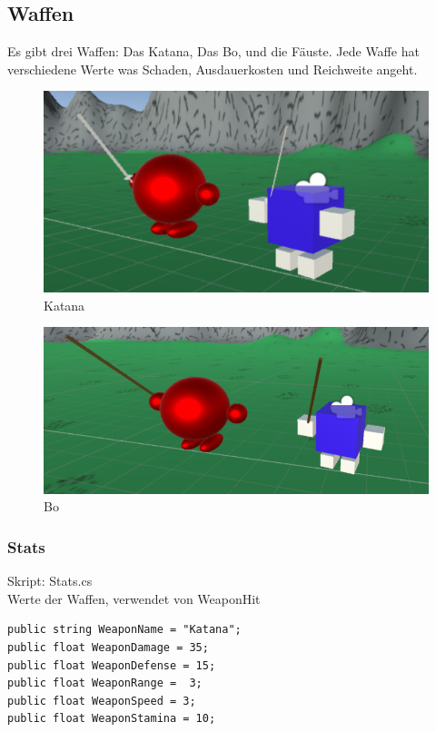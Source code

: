 
\subsection{Waffen}

Es gibt drei  Waffen: Das Katana, Das Bo, und die Fäuste.
Jede Waffe hat verschiedene Werte was Schaden, Ausdauerkosten und Reichweite angeht.
\begin{figure}[H]
\includegraphics[scale=1]{screenshots/katana.png}
\caption{Katana}
\end{figure}

\begin{figure}[H]
\includegraphics[scale=1]{screenshots/bo.png}
\caption{Bo}
\end{figure}



\subsubsection{Stats}
Skript: Stats.cs\\
Werte der Waffen, verwendet von WeaponHit

\begin{lstlisting}
public string WeaponName = "Katana";
public float WeaponDamage = 35;
public float WeaponDefense = 15;
public float WeaponRange =	3;
public float WeaponSpeed = 3;
public float WeaponStamina = 10;
\end{lstlisting}


